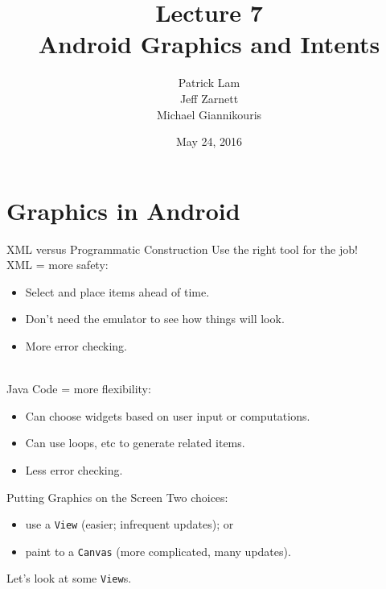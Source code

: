 \documentclass[aspectratio=169]{beamer}
\title{Lecture 7 \\ Android Graphics and Intents}
\date{May 24, 2016}
\author{Patrick Lam \\ Jeff Zarnett \\ Michael Giannikouris}
\institute{Department of Electrical and Computer Engineering}
\begin{document}
\maketitle

\section*{Graphics in Android}



\begin{frame}{XML versus Programmatic Construction}
Use the right tool for the job! \\
\vspace{1em}
XML = more safety:
\begin{itemize}
\item Select and place items ahead of time.
\item Don't need the emulator to see how things will look.
\item More error checking.
\end{itemize}
~\\
Java Code = more flexibility:
\begin{itemize}
\item Can choose widgets based on user input or computations.
\item Can use loops, etc to generate related items.
\item Less error checking.
\end{itemize}
\end{frame}




\begin{frame}[fragile]{Putting Graphics on the Screen}
\Large
Two choices:
\begin{itemize}
\item use a {\tt View} (easier; infrequent updates); or
\item paint to a {\tt Canvas} (more complicated, many updates).
\end{itemize}
\vspace{1em}
Let's look at some \texttt{View}s.
\end{frame}
\end{document}
